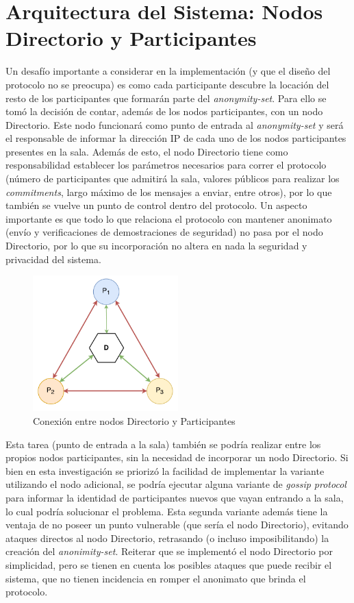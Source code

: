 \section{Arquitectura del Sistema: Nodos Directorio y Participantes}

Un desafío importante a considerar en la implementación (y que el diseño del 
protocolo no se preocupa) es como cada participante descubre la locación del resto de los 
participantes que formarán parte del \emph{anonymity-set}. Para ello se tomó 
la decisión de contar, además de los nodos participantes, con un nodo 
Directorio. Este nodo funcionará como punto de entrada al \emph{anonymity-set} 
y será el responsable de informar la dirección IP de cada uno de los nodos 
participantes presentes en la sala. Además de esto, el nodo Directorio tiene 
como responsabilidad establecer los parámetros necesarios para correr el protocolo (número de 
participantes que admitirá la sala, valores públicos para realizar los \emph{commitments}, 
largo máximo de los mensajes a enviar, entre otros), por lo que también se vuelve 
un punto de control dentro del protocolo. Un aspecto importante es que todo lo que 
relaciona el protocolo con mantener anonimato (envío y verificaciones de 
demostraciones de seguridad) no pasa por el nodo Directorio, por lo que su 
incorporación no altera en nada la seguridad y privacidad del sistema.

\begin{figure}[H]
  \centering
    \includegraphics[width=0.5\textwidth]{imagenes/architecture.pdf}
  \caption{Conexión entre nodos Directorio y Participantes}
  \label{fig:connections-directory-participants}
\end{figure}

Esta tarea (punto de entrada a la sala) también se podría realizar entre los propios nodos participantes, 
sin la necesidad de incorporar un nodo Directorio. Si bien en esta 
investigación se priorizó la facilidad de implementar la variante utilizando 
el nodo adicional, se podría ejecutar alguna variante de \emph{gossip protocol} 
\cite{Demers:1987:EAR:41840.41841} 
para informar la identidad de participantes nuevos que vayan entrando a la sala, lo 
cual podría solucionar el problema. Esta segunda variante además tiene la ventaja 
de no poseer un punto vulnerable (que sería el nodo Directorio), evitando 
ataques directos al nodo Directorio, retrasando (o incluso imposibilitando) la 
creación del \emph{anonimity-set}. Reiterar que se implementó el nodo 
Directorio por simplicidad, pero se tienen en cuenta los posibles ataques que 
puede recibir el sistema, que no tienen incidencia en romper el anonimato que 
brinda el protocolo.

